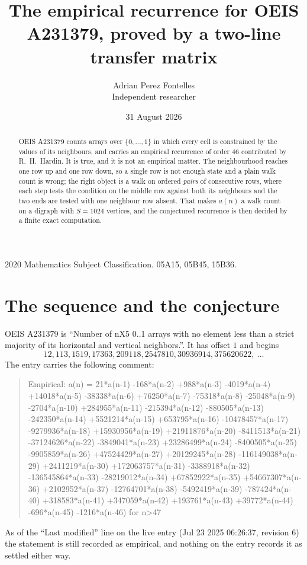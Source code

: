 \documentclass[11pt,a4paper]{article}
\title{The empirical recurrence for OEIS A231379, proved by a two-line transfer matrix}
\author{Adrian Perez Fontelles\\ \small Independent researcher}
\date{31 August 2026}
\theoremstyle{plain}
\theoremstyle{definition}
\begin{document}
\maketitle

\begin{abstract}
OEIS A231379 counts arrays over $\{0,\dots,1\}$ in which every cell is constrained by the
values of its neighbours, and carries an empirical recurrence of order $46$ contributed
by R.~H.~Hardin. It is true, and it is not an empirical matter. The neighbourhood reaches one
row up and one row down, so a single row is not enough state and a plain walk count
is wrong; the right object is a walk on ordered \emph{pairs} of consecutive rows, where
each step tests the condition on the middle row against both its neighbours and the two
ends are tested with one neighbour row absent. That makes $a(n)$ a walk count on a digraph
with $S=1024$ vertices, and the conjectured recurrence is then decided by a finite exact
computation.
\end{abstract}

\noindent\small 2020 Mathematics Subject Classification. 05A15, 05B45, 15B36.\normalsize

\section{The sequence and the conjecture}

OEIS A231379 is ``Number of nX5 0..1 arrays with no element less than a strict majority of its horizontal and vertical neighbors.''. It has offset $1$ and begins
\[
12, 113, 1519, 17363, 209118, 2547810, 30936914, 375620622,\ \dots
\]
The entry carries the following comment:
\begin{quote}\small
Empirical: a(n) = 21*a(n-1) -168*a(n-2) +988*a(n-3) -4019*a(n-4) +14018*a(n-5) -38338*a(n-6) +76250*a(n-7) -75318*a(n-8) -25048*a(n-9) -2704*a(n-10) +284955*a(n-11) -215394*a(n-12) -880505*a(n-13) -242350*a(n-14) +5521214*a(n-15) +653795*a(n-16) -10478457*a(n-17) -9279936*a(n-18) +15930956*a(n-19) +21911876*a(n-20) -8411513*a(n-21) -37124626*a(n-22) -3849041*a(n-23) +23286499*a(n-24) -8400505*a(n-25) -9905859*a(n-26) +47524429*a(n-27) +20129245*a(n-28) -116149038*a(n-29) +2411219*a(n-30) +172063757*a(n-31) -3388918*a(n-32) -136545864*a(n-33) -28219012*a(n-34) +67852922*a(n-35) +54667307*a(n-36) +2102952*a(n-37) -12764701*a(n-38) -5492419*a(n-39) -787424*a(n-40) +318583*a(n-41) +347059*a(n-42) +193761*a(n-43) +39772*a(n-44) -696*a(n-45) -1216*a(n-46) for n>47
\end{quote}
As of the ``Last modified'' line on the live entry (Jul 23 2025 06:26:37, revision 6) the statement is
still recorded as empirical, and nothing on the entry records it as settled either way.
\end{document}
